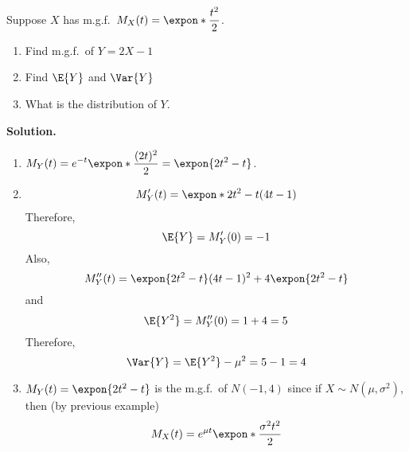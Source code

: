\begin{Example}{}{}
    Suppose $ X $ has m.g.f.\ $ \displaystyle  M_X(t)=\expon*{\frac{t^2}{2}} $.
    \begin{enumerate}[label=(\roman*)]
        \item Find m.g.f.\ of $ Y=2X-1 $
        \item Find $ \E{Y} $ and $ \Var{Y} $
        \item What is the distribution of $ Y $.
    \end{enumerate}

    \textbf{Solution.}
    \begin{enumerate}[label=(\roman*)]
        \item $ \displaystyle  M_Y(t)=e^{-t}\expon*{\frac{(2t)^2}{2}}=
                  \expon{2t^2-t} $.

        \item \begin{align*}
                  M^\prime_Y(t)=\expon*{2t^2-t}(4t-1)
              \end{align*}
              Therefore,
              \[ \E{Y}=M^\prime_Y(0)=-1 \]
              Also,
              \[ M^{\prime\prime}_Y(t)=\expon{2t^2-t}(4t-1)^2+4
                  \expon{2t^2-t} \]
              and
              \[ \E{Y^2}=M_Y^{\prime\prime}(0)=1+4=5 \]
              Therefore,
              \[ \Var{Y}=\E{Y^2}-\mu^2=5-1=4 \]
        \item $ M_Y(t)=\expon{2t^2-t} $ is the m.g.f.\
              of $ N(-1,4) $ since
              if $ X \sim N(\mu,\sigma^2) $, then (by previous example)
              \[ M_X(t)=e^{\mu t}\expon*{\frac{\sigma^2 t^2}{2} } \]
    \end{enumerate}
\end{Example}
